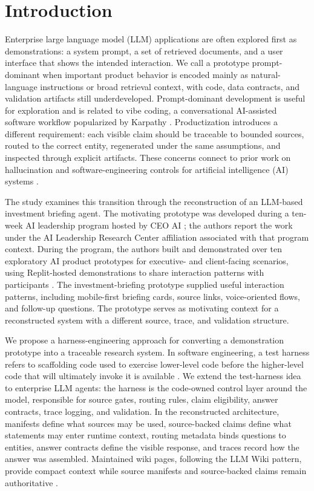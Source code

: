 \section{Introduction}

Enterprise large language model (LLM) applications are often explored first as demonstrations: a system prompt, a set of retrieved documents, and a user interface that shows the intended interaction. We call a prototype prompt-dominant when important product behavior is encoded mainly as natural-language instructions or broad retrieval context, with code, data contracts, and validation artifacts still underdeveloped. Prompt-dominant development is useful for exploration and is related to vibe coding, a conversational AI-assisted software workflow popularized by Karpathy \citep{karpathy2025vibecoding,meske2025vibecoding}. Productization introduces a different requirement: each visible claim should be traceable to bounded sources, routed to the correct entity, regenerated under the same assumptions, and inspected through explicit artifacts. These concerns connect to prior work on hallucination and software-engineering controls for artificial intelligence (AI) systems \citep{ji2023hallucination,martinezfernandez2022seai,kreuzberger2023mlops}.

The study examines this transition through the reconstruction of an LLM-based investment briefing agent. The motivating prototype was developed during a ten-week AI leadership program hosted by CEO AI \citep{ceoai2026leadership}; the authors report the work under the AI Leadership Research Center affiliation associated with that program context. During the program, the authors built and demonstrated over ten exploratory AI product prototypes for executive- and client-facing scenarios, using Replit-hosted demonstrations to share interaction patterns with participants \citep{replit2026platform}. The investment-briefing prototype supplied useful interaction patterns, including mobile-first briefing cards, source links, voice-oriented flows, and follow-up questions. The prototype serves as motivating context for a reconstructed system with a different source, trace, and validation structure.

We propose a harness-engineering approach for converting a demonstration prototype into a traceable research system. In software engineering, a test harness refers to scaffolding code used to exercise lower-level code before the higher-level code that will ultimately invoke it is available \citep{isoiecieee2017vocabulary}. We extend the test-harness idea to enterprise LLM agents: the harness is the code-owned control layer around the model, responsible for source gates, routing rules, claim eligibility, answer contracts, trace logging, and validation. In the reconstructed architecture, manifests define what sources may be used, source-backed claims define what statements may enter runtime context, routing metadata binds questions to entities, answer contracts define the visible response, and traces record how the answer was assembled. Maintained wiki pages, following the LLM Wiki pattern, provide compact context while source manifests and source-backed claims remain authoritative \citep{karpathy2026llmwiki}.

